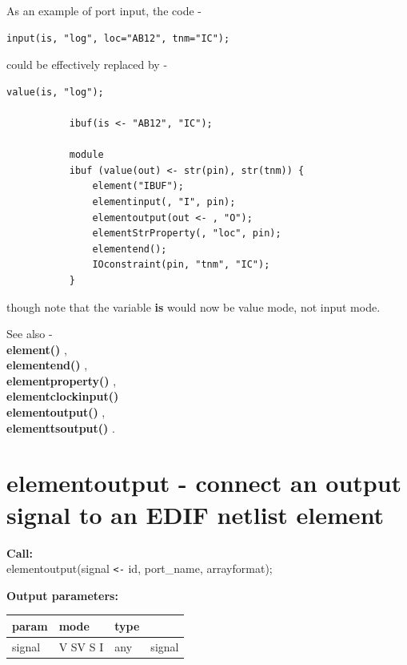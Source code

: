         As an example of port input, the code -
        
        \begin{lstlisting}[gobble=8, language=threepl]
           input(is, "log", loc="AB12", tnm="IC");
        \end{lstlisting}
        
        could be effectively replaced by -
        
        \begin{lstlisting}[gobble=8, language=threepl]
           value(is, "log");

           ibuf(is <- "AB12", "IC");

           module
           ibuf (value(out) <- str(pin), str(tnm)) {
               element("IBUF");
               elementinput(, "I", pin);
               elementoutput(out <- , "O");
               elementStrProperty(, "loc", pin);
               elementend();
               IOconstraint(pin, "tnm", "IC");
           }
        \end{lstlisting}
        
        though note that the variable {\bf is} would now be value mode, not
        input mode.

        See also - \\
        {\bf element()} , \\
        {\bf elementend()} , \\
        {\bf elementproperty()} , \\
        {\bf elementclockinput()}  \\
        {\bf elementoutput()} , \\
        {\bf elementtsoutput()} .





    \section{elementoutput - connect an output signal to an EDIF netlist element}\label{sec:ipelmntout}
        
        {\bf Call:} \\
        elementoutput(signal \verb'<-' id, port\_name, arrayformat);
        
        {\bf Output parameters:} \\
        \begin{tabular}{| l | l | l | l |}
        \hline
        param  & mode     & type  & \\
        \hline \hline
        signal      & V SV S I & any & signal                    \\ \hline
        \end{tabular}
        
